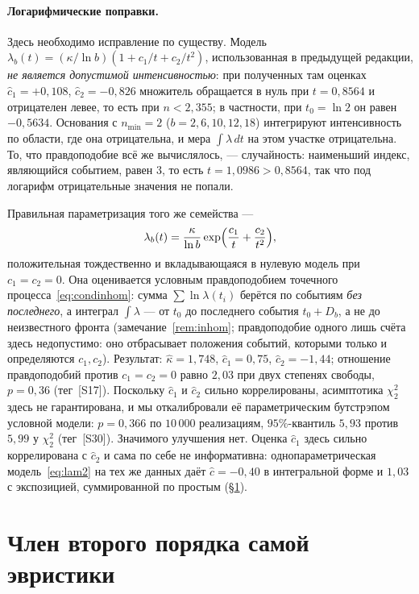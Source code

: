 \documentclass[11pt,a4paper]{article}
\theoremstyle{plain}
\theoremstyle{remark}
\begin{document}
\paragraph{Логарифмические поправки.} Здесь необходимо исправление по существу.
Модель $\lambda_b(t)=(\kappa/\ln b)(1+c_1/t+c_2/t^2)$, использованная в предыдущей
редакции, \emph{не является допустимой интенсивностью}: при полученных там оценках
$\hat c_1=+0{,}108$, $\hat c_2=-0{,}826$ множитель обращается в нуль при
$t=0{,}8564$ и отрицателен левее, то есть при $n<2{,}355$; в частности, при
$t_0=\ln 2$ он равен $-0{,}5634$. Основания с $n_{\min}=2$ ($b=2,6,10,12,18$)
интегрируют интенсивность по области, где она отрицательна, и мера
$\int\lambda\,dt$ на этом участке отрицательна. То, что правдоподобие всё же
вычислялось, --- случайность: наименьший индекс, являющийся событием, равен $3$,
то есть $t=1{,}0986>0{,}8564$, так что под логарифм отрицательные значения не
попали.

Правильная параметризация того же семейства ---
\begin{equation}\label{eq:logcorr}
\lambda_b(t)=\frac{\kappa}{\ln b}\exp\Bigl(\frac{c_1}{t}+\frac{c_2}{t^2}\Bigr),
\end{equation}
положительная тождественно и вкладывающаяся в нулевую модель при $c_1=c_2=0$.
Она оценивается условным правдоподобием точечного
процесса~\eqref{eq:condinhom}: сумма $\sum\ln\lambda(t_i)$ берётся по событиям
\emph{без последнего}, а интеграл $\int\lambda$ --- от $t_0$ до последнего события
$t_0+D_b$, а не до неизвестного фронта (замечание~\ref{rem:inhom}; правдоподобие
одного лишь счёта здесь недопустимо: оно отбрасывает положения событий, которыми
только и определяются $c_1,c_2$). Результат: $\hat\kappa=1{,}748$,
$\hat c_1=0{,}75$, $\hat c_2=-1{,}44$; отношение правдоподобий против $c_1=c_2=0$
равно $2{,}03$ при двух степенях свободы, $p=0{,}36$ (тег~[S17]). Поскольку
$\hat c_1$ и $\hat c_2$ сильно коррелированы, асимптотика $\chi^2_2$ здесь не
гарантирована, и мы откалибровали её параметрическим бутстрэпом условной модели:
$p=0{,}366$ по $10\,000$ реализациям, $95\%$-квантиль $5{,}93$ против $5{,}99$ у
$\chi^2_2$ (тег~[S30]). Значимого улучшения нет. Оценка $\hat c_1$ здесь сильно коррелирована с $\hat c_2$ и сама по себе не
информативна: однопараметрическая модель~\eqref{eq:lam2} на тех же данных даёт
$\hat c=-0{,}40$ в интегральной форме и $1{,}03$ с экспозицией, суммированной по
простым (\S\ref{sec:second}).

\section{Член второго порядка самой эвристики}\label{sec:second}
\end{document}
